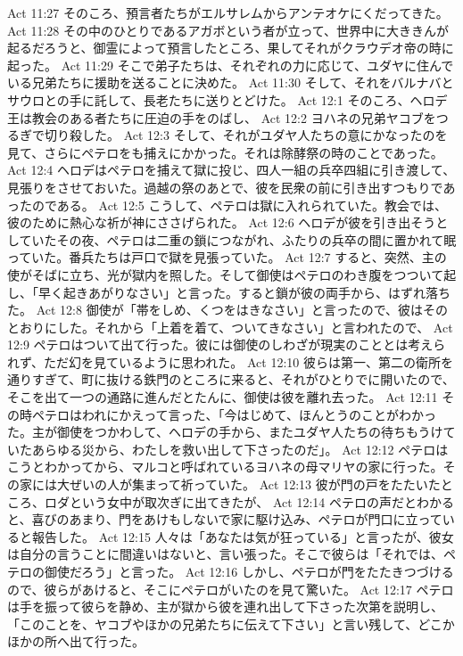 Act 11:27  そのころ、預言者たちがエルサレムからアンテオケにくだってきた。
Act 11:28  その中のひとりであるアガボという者が立って、世界中に大ききんが起るだろうと、御霊によって預言したところ、果してそれがクラウデオ帝の時に起った。
Act 11:29  そこで弟子たちは、それぞれの力に応じて、ユダヤに住んでいる兄弟たちに援助を送ることに決めた。
Act 11:30  そして、それをバルナバとサウロとの手に託して、長老たちに送りとどけた。
Act 12:1  そのころ、ヘロデ王は教会のある者たちに圧迫の手をのばし、
Act 12:2  ヨハネの兄弟ヤコブをつるぎで切り殺した。
Act 12:3  そして、それがユダヤ人たちの意にかなったのを見て、さらにペテロをも捕えにかかった。それは除酵祭の時のことであった。
Act 12:4  ヘロデはペテロを捕えて獄に投じ、四人一組の兵卒四組に引き渡して、見張りをさせておいた。過越の祭のあとで、彼を民衆の前に引き出すつもりであったのである。
Act 12:5  こうして、ペテロは獄に入れられていた。教会では、彼のために熱心な祈が神にささげられた。
Act 12:6  ヘロデが彼を引き出そうとしていたその夜、ペテロは二重の鎖につながれ、ふたりの兵卒の間に置かれて眠っていた。番兵たちは戸口で獄を見張っていた。
Act 12:7  すると、突然、主の使がそばに立ち、光が獄内を照した。そして御使はペテロのわき腹をつついて起し、「早く起きあがりなさい」と言った。すると鎖が彼の両手から、はずれ落ちた。
Act 12:8  御使が「帯をしめ、くつをはきなさい」と言ったので、彼はそのとおりにした。それから「上着を着て、ついてきなさい」と言われたので、
Act 12:9  ペテロはついて出て行った。彼には御使のしわざが現実のこととは考えられず、ただ幻を見ているように思われた。
Act 12:10  彼らは第一、第二の衛所を通りすぎて、町に抜ける鉄門のところに来ると、それがひとりでに開いたので、そこを出て一つの通路に進んだとたんに、御使は彼を離れ去った。
Act 12:11  その時ペテロはわれにかえって言った、「今はじめて、ほんとうのことがわかった。主が御使をつかわして、ヘロデの手から、またユダヤ人たちの待ちもうけていたあらゆる災から、わたしを救い出して下さったのだ」。
Act 12:12  ペテロはこうとわかってから、マルコと呼ばれているヨハネの母マリヤの家に行った。その家には大ぜいの人が集まって祈っていた。
Act 12:13  彼が門の戸をたたいたところ、ロダという女中が取次ぎに出てきたが、
Act 12:14  ペテロの声だとわかると、喜びのあまり、門をあけもしないで家に駆け込み、ペテロが門口に立っていると報告した。
Act 12:15  人々は「あなたは気が狂っている」と言ったが、彼女は自分の言うことに間違いはないと、言い張った。そこで彼らは「それでは、ペテロの御使だろう」と言った。
Act 12:16  しかし、ペテロが門をたたきつづけるので、彼らがあけると、そこにペテロがいたのを見て驚いた。
Act 12:17  ペテロは手を振って彼らを静め、主が獄から彼を連れ出して下さった次第を説明し、「このことを、ヤコブやほかの兄弟たちに伝えて下さい」と言い残して、どこかほかの所へ出て行った。
